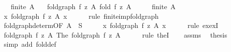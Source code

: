 \begin{isabellebody}
\ \ \ {\isachardoublequoteopen}finite\ A{\isachardoublequoteclose}\isanewline
\ \ \ {\isachardoublequoteopen}fold{\isacharunderscore}{\kern0pt}graph\ f\ z\ A\ {\isacharparenleft}{\kern0pt}fold\ f\ z\ A{\isacharparenright}{\kern0pt}{\isachardoublequoteclose}\isanewline
%
\isadelimproof
%
\endisadelimproof
%
\isatagproof
{}\isamarkupfalse%
\ {\isacharminus}{\kern0pt}\isanewline
\ \ \isamarkupfalse%
\ {\isacartoucheopen}finite\ A{\isacartoucheclose}\ \isamarkupfalse%
\ {\isachardoublequoteopen}{\isasymexists}x{\isachardot}{\kern0pt}\ fold{\isacharunderscore}{\kern0pt}graph\ f\ z\ A\ x{\isachardoublequoteclose}\isanewline
\ \ \ \ \isamarkupfalse%
\ {\isacharparenleft}{\kern0pt}rule\ finite{\isacharunderscore}{\kern0pt}imp{\isacharunderscore}{\kern0pt}fold{\isacharunderscore}{\kern0pt}graph{\isacharparenright}{\kern0pt}\isanewline
\ \ \isamarkupfalse%
\ \isamarkupfalse%
\ fold{\isacharunderscore}{\kern0pt}graph{\isacharunderscore}{\kern0pt}determ{\isacharbrackleft}{\kern0pt}OF\ {\isacartoucheopen}A\ {\isasymsubseteq}\ S{\isacartoucheclose}{\isacharbrackright}{\kern0pt}\isanewline
\ \ \isamarkupfalse%
\ \isamarkupfalse%
\ {\isachardoublequoteopen}{\isasymexists}{\isacharbang}{\kern0pt}x{\isachardot}{\kern0pt}\ fold{\isacharunderscore}{\kern0pt}graph\ f\ z\ A\ x{\isachardoublequoteclose}\isanewline
\ \ \ \ \isamarkupfalse%
\ {\isacharparenleft}{\kern0pt}rule\ ex{\isacharunderscore}{\kern0pt}ex{}I{\isacharparenright}{\kern0pt}\isanewline
\ \ \isamarkupfalse%
\ \isamarkupfalse%
\ {\isachardoublequoteopen}fold{\isacharunderscore}{\kern0pt}graph\ f\ z\ A\ {\isacharparenleft}{\kern0pt}The\ {\isacharparenleft}{\kern0pt}fold{\isacharunderscore}{\kern0pt}graph\ f\ z\ A{\isacharparenright}{\kern0pt}{\isacharparenright}{\kern0pt}{\isachardoublequoteclose}\isanewline
\ \ \ \ \isamarkupfalse%
\ {\isacharparenleft}{\kern0pt}rule\ theI{\isacharprime}{\kern0pt}{\isacharparenright}{\kern0pt}\isanewline
\ \ \isamarkupfalse%
\ assms\ \isamarkupfalse%
\ {\isacharquery}{\kern0pt}thesis\isanewline
\ \ \ \ \isamarkupfalse%
\ {\isacharparenleft}{\kern0pt}simp\ add{\isacharcolon}{\kern0pt}\ fold{\isacharunderscore}{\kern0pt}def{\isacharparenright}{\kern0pt}\isanewline
{}\isamarkupfalse%
%
\endisatagproof
{\isafoldproof}%
%
\isadelimproof
%
\endisadelimproof
%
\begin{isamarkuptext}%

\end{isamarkuptext}
\end{isabellebody}
